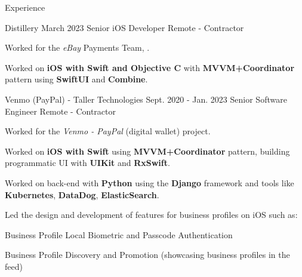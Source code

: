 \documentclass{curriculum}
\begin{document}
\begin{cvsection}{Experience}


    \makesectionitemheader
        {Distillery}                                               {March 2023}
        {Senior iOS Developer}                                     {Remote - Contractor}

        \begin{sectionitemlist}

        \item{
            Worked for the \textit{eBay} Payments Team, .
        }

        \item{
            Worked on \textbf{iOS with Swift and Objective C} with \textbf{MVVM+Coordinator} pattern using \textbf{SwiftUI} and \textbf{Combine}.
        }

        \end{sectionitemlist}


    \makesectionitemheader
        {Venmo (PayPal) - Taller Technologies}              {Sept. 2020 - Jan. 2023}
        {Senior Software Engineer}                                 {Remote - Contractor}

        \begin{sectionitemlist}

        \item{
            Worked for the \textit{Venmo - PayPal} (digital wallet) project.
        }

        \item{
            Worked on \textbf{iOS with Swift} using \textbf{MVVM+Coordinator} pattern,
            building programmatic UI with \textbf{UIKit} and \textbf{RxSwift}.
        }

        \item{
            Worked on back-end with \textbf{Python} using the \textbf{Django} framework
            and tools like \textbf{Kubernetes}, \textbf{DataDog}, \textbf{ElasticSearch}.
        }

        \item{
            Led the design and development of features for business profiles on iOS such as:
        }{
            \begin{colsectionitemlist}{2}
            \item{Business Profile Local Biometric and Passcode Authentication}
            \item{Business Profile Discovery and Promotion (showcasing business profiles in the feed)}
            \end{colsectionitemlist}
        }


\end{sectionitemlist}
\end{cvsection}
\end{document}
